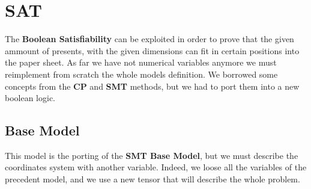 \chapter{SAT}
The \textbf{Boolean Satisfiability} can be exploited in order to prove that the given ammount of presents, with the given dimensions can
fit in certain positions into the paper sheet. As far we have not numerical variables anymore we must reimplement from scratch the whole
models definition. We borrowed some concepts from the \textbf{CP} and \textbf{SMT} methods, but we had to port them into a new boolean logic.

\section{Base Model}
This model is the porting of the \textbf{SMT Base Model}, but we must describe the coordinates system with another variable.
Indeed, we loose all the variables of the precedent model, and we use a new tensor that will describe the whole problem. 

